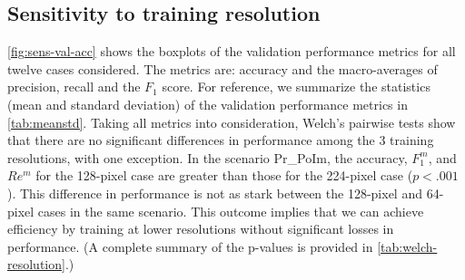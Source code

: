 \documentclass[Journal, letterpaper, DoubleSpace, InsideFigs]{ascelike-new}
\begin{document}
\subsection{Sensitivity to training resolution}
\autoref{fig:sens-val-acc} shows the boxplots of the validation performance metrics for all twelve cases considered.
The metrics are: accuracy and the macro-averages of precision, recall and the $F_{1}$ score.
For reference, we summarize the statistics (mean and standard deviation) of the validation performance metrics in \autoref{tab:meanstd}.
Taking all metrics into consideration, Welch's pairwise tests show that there are no significant differences in performance among the 3 training resolutions, with one exception.
In the scenario Pr\_PoIm, the accuracy, $F_{1}^{m}$, and $Re^{m}$ for the 128-pixel case are greater than those for the 224-pixel case ($p<.001$).
This difference in performance is not as stark between the 128-pixel and 64-pixel cases in the same scenario.
This outcome implies that we can achieve efficiency by  training at lower resolutions without significant losses in performance.
(A complete summary of the p-values is provided in \autoref{tab:welch-resolution}.)
\end{document}
